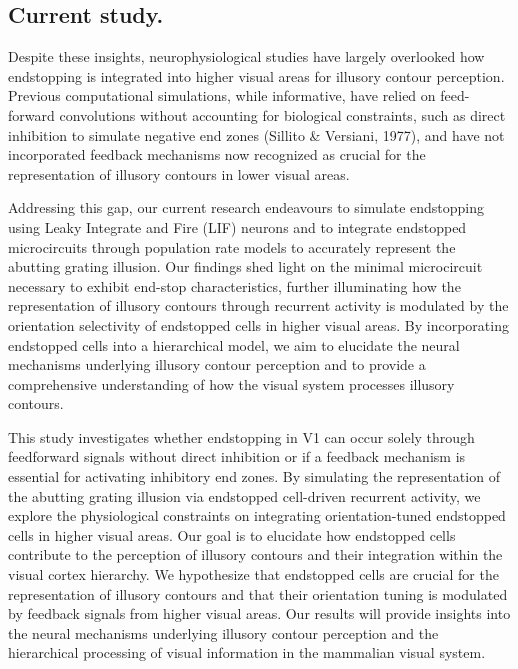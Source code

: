 \documentclass[12pt]{article}
\begin{document}
\bigbreak
\subsection{Current study.}
Despite these insights, neurophysiological studies have largely overlooked how endstopping is integrated into higher visual areas for illusory contour perception. Previous computational simulations, while informative, have relied on feed-forward convolutions without accounting for biological constraints, such as direct inhibition to simulate negative end zones (Sillito \& Versiani, 1977), and have not incorporated feedback mechanisms now recognized as crucial for the representation of illusory contours in lower visual areas.

Addressing this gap, our current research endeavours to simulate endstopping using Leaky Integrate and Fire (LIF) neurons and to integrate endstopped microcircuits through population rate models to accurately represent the abutting grating illusion. Our findings shed light on the minimal microcircuit necessary to exhibit end-stop characteristics, further illuminating how the representation of illusory contours through recurrent activity is modulated by the orientation selectivity of endstopped cells in higher visual areas. By incorporating endstopped cells into a hierarchical model, we aim to elucidate the neural mechanisms underlying illusory contour perception and to provide a comprehensive understanding of how the visual system processes illusory contours.

This study investigates whether endstopping in V1 can occur solely through feedforward signals without direct inhibition or if a feedback mechanism is essential for activating inhibitory end zones. By simulating the representation of the abutting grating illusion via endstopped cell-driven recurrent activity, we explore the physiological constraints on integrating orientation-tuned endstopped cells in higher visual areas. Our goal is to elucidate how endstopped cells contribute to the perception of illusory contours and their integration within the visual cortex hierarchy. We hypothesize that endstopped cells are crucial for the representation of illusory contours and that their orientation tuning is modulated by feedback signals from higher visual areas. Our results will provide insights into the neural mechanisms underlying illusory contour perception and the hierarchical processing of visual information in the mammalian visual system.

\newpage
\end{document}
